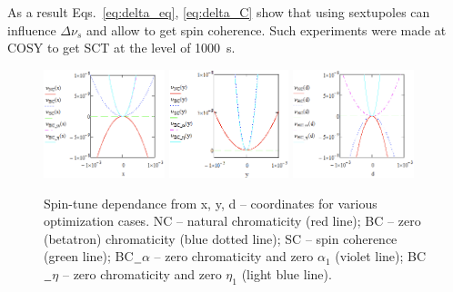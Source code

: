 \documentclass[a4paper,
               keeplastbox,   %
               ]{jacow}
\begin{document}
\par As a result Eqs.~\ref{eq:delta_eq}, \ref{eq:delta_C} show that using sextupoles can influence $\Delta\nu_{s}$ and allow to get spin coherence. Such experiments were made at COSY to get SCT at the level of 1000~s. \cite{COSY}

\begin{figure}[!ht]
   \centering
   \includegraphics*[width=0.314\textwidth]{img/MOPA070_f2-1}
   \includegraphics*[width=0.310\textwidth]{img/MOPA070_f2-2}
   \includegraphics*[width=0.314\textwidth]{img/MOPA070_f2-3}
   \caption{Spin-tune dependance from x, y, d – coordinates for various optimization cases. NC – natural chromaticity (red line); BC – zero (betatron) chromaticity (blue dotted line); SC – spin coherence (green line); BC$\underline {\hspace{0.2cm}}$$\alpha$ –  zero chromaticity and zero $\alpha_{1}$ (violet line); BC$\underline {\hspace{0.2cm}}$$\eta$ –  zero chromaticity and zero $\eta_{1}$ (light blue line).}
   \label{fig:spintunes}
\end{figure}
\end{document}
